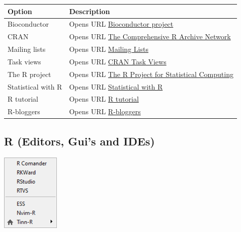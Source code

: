 \begin{scriptsize}
  \begin{tabularx}{\textwidth}{>{\hsize=0.3\hsize}X>{\hsize=0.7\hsize}X}\\
    \hline
    \textbf{Option} & \textbf{Description} \\
    \hline
    Bioconductor & Opens URL \href{http://www.bioconductor.org/}{Bioconductor project} \\
    CRAN & Opens URL \href{http://cran.r-project.org/}{The Comprehensive R Archive Network} \\
    Mailing lists & Opens URL \href{https://www.r-project.org/mail.html}{Mailing Lists} \\
    Task views & Opens URL \href{http://cran.r-project.org/web/views/}{CRAN Task Views} \\
    The R project & Opens URL \href{http://www.r-project.org}{The R Project for Statistical Computing} \\
    \hdashline[1pt/1pt]
    Statistical with R & Opens URL \href{http://zoonek2.free.fr/UNIX/48\_R/all.html}{Statistical with R} \\
    R tutorial & Opens URL \href{http://www.r-tutor.com/}{R tutorial} \\
    \hdashline[1pt/1pt]
    R-bloggers & Opens URL \href{https://www.r-bloggers.com/}{R-bloggers} \\
    \hline
  \end{tabularx}
\end{scriptsize}


\hypertarget{menu_web_rguis}{}
\subsection{R (Editors, Gui's and IDEs)}

\includegraphics[scale=0.8]{./res/menu_web_rguis.png}\\

